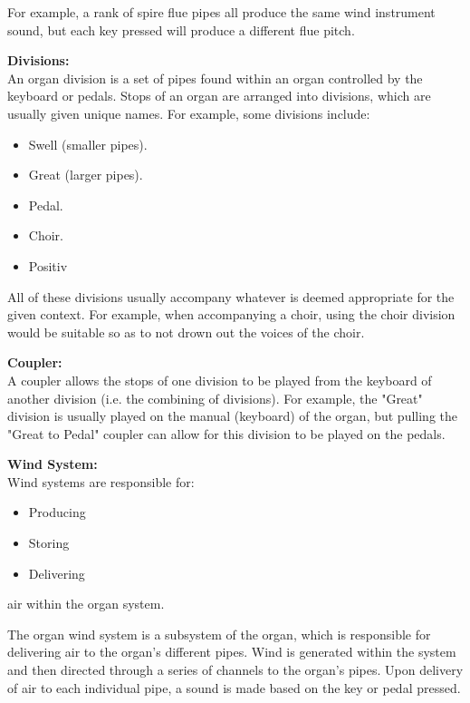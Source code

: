 For example, a rank of spire flue pipes all produce the same wind instrument sound, but each key pressed will produce a different flue pitch.  \cite{organvideo}

\medskip
\noindent \textbf{Divisions:}
\\ \hspace*{0.5cm} An organ division is a set of pipes found within an organ controlled by the keyboard or pedals. Stops of an organ are arranged into divisions, which are usually given unique names. For example, some divisions include:
\begin{itemize}
\item Swell (smaller pipes).
\item Great (larger pipes).
\item Pedal.
\item Choir.
\item Positiv
\end{itemize}

All of these divisions usually accompany whatever is deemed appropriate for the given context. For example, when accompanying a choir, using the choir division would be suitable so as to not drown out the voices of the choir. \cite{organvideo}

\medskip
\noindent \textbf{Coupler:}
\\ \hspace*{0.5cm} A coupler allows the stops of one division to be played from the keyboard of another division (i.e. the combining of divisions). For example, the "Great" division is usually played on the manual (keyboard) of the organ, but pulling the "Great to Pedal" coupler can allow for this division to be played on the pedals. \cite{organvideo}

\medskip
\noindent \textbf{Wind System:}
\\ \hspace*{0.5cm} Wind systems are responsible for:
\begin{itemize}
\item Producing
\item Storing
\item Delivering
\end{itemize}
air within the organ system.

The organ wind system is a subsystem of the organ, which is responsible for delivering air to the organ's different pipes. Wind is generated within the system and then directed through a series of channels to the organ's pipes. Upon delivery of air to each individual pipe, a sound is made based on the key or pedal pressed. \cite{organvideo}

